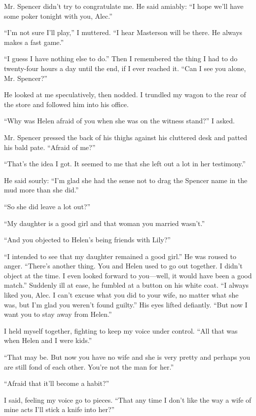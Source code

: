 \documentclass{novel}
\begin{document}
{Mr. Spencer didn’t try to congratulate me. He said amiably: “I hope we’ll have some poker tonight with you, Alec.”

“I’m not sure I’ll play,” I muttered. “I hear Masterson will be there. He always makes a fast game.”

“I guess I have nothing else to do.” Then I remembered the thing I had to do twenty-four hours a day until the end, if I ever reached it. “Can I see you alone, Mr. Spencer?”

He looked at me speculatively, then nodded. I trundled my wagon to the rear of the store and followed him into his office.

“Why was Helen afraid of you when she was on the witness stand?” I asked.

Mr. Spencer pressed the back of his thighs against his cluttered desk and patted his bald pate. “Afraid of me?”

“That’s the idea I got. It seemed to me that she left out a lot in her testimony.”

He said sourly: “I’m glad she had the sense not to drag the Spencer name in the mud more than she did.”

“So she did leave a lot out?”

“My daughter is a good girl and that woman you married wasn’t.”

“And you objected to Helen’s being friends with Lily?”

“I intended to see that my daughter remained a good girl.” He was roused to anger. “There’s another thing. You and Helen used to go out together. I didn’t object at the time. I even looked forward to you—well, it would have been a good match.” Suddenly ill at ease, he fumbled at a button on his white coat. “I always liked you, Alec. I can’t excuse what you did to your wife, no matter what she was, but I’m glad you weren’t found guilty.” His eyes lifted defiantly. “But now I want you to stay away from Helen.”

I held myself together, fighting to keep my voice under control. “All that was when Helen and I were kids.”

“That may be. But now you have no wife and she is very pretty and perhaps you are still fond of each other. You’re not the man for her.”

“Afraid that it’ll become a habit?”

I said, feeling my voice go to pieces. “That any time I don’t like the way a wife of mine acts I’ll stick a knife into her?”

}
\end{document}
